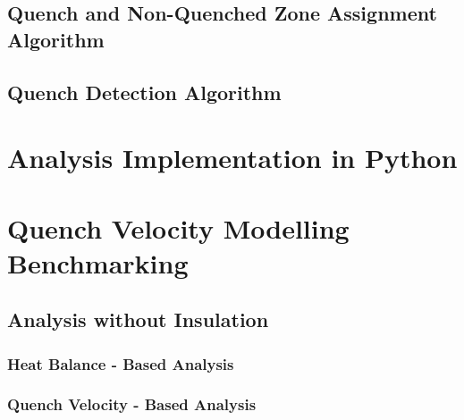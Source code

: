 \documentclass{article}
\begin{document}
\subsection{Quench and Non-Quenched Zone Assignment Algorithm}
\label{subsection:node_searching_algorithm}


\subsection{Quench Detection Algorithm}
\label{subsection:quench_detection_algorithm}


\clearpage
\section{Analysis Implementation in Python}
\label{section:python_implementation}
% 

\clearpage
\section{Quench Velocity Modelling Benchmarking}
\label{section:quench_velocity_benchmarking}


\subsection{Analysis without Insulation}
\label{subsection:quench_velocity_benchmarking_no_insulation}

\subsubsection{Heat Balance - Based Analysis}
\label{subsection:quench_velocity_benchmarking_no_insulation_heat_balance}


\subsubsection{Quench Velocity - Based Analysis}
\label{subsection:quench_velocity_benchmarking_no_insulation_quench_velocity}

\end{document}
